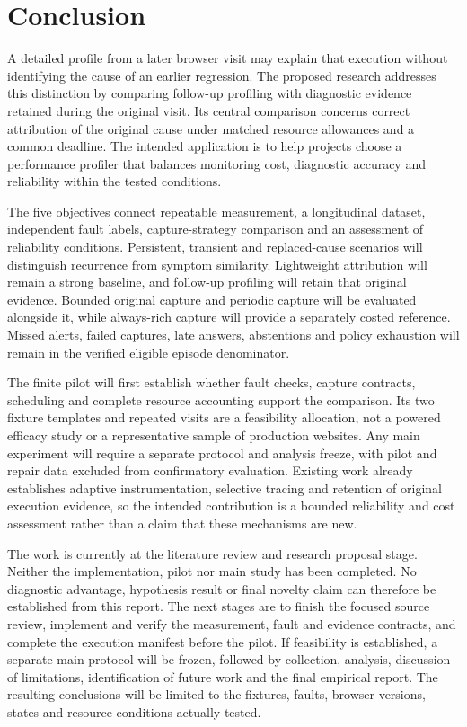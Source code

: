 \chapter{Conclusion}
\label{chap:conclusion}

A detailed profile from a later browser visit may explain that execution without identifying the cause of an earlier regression. The proposed research addresses this distinction by comparing follow-up profiling with diagnostic evidence retained during the original visit. Its central comparison concerns correct attribution of the original cause under matched resource allowances and a common deadline. The intended application is to help projects choose a performance profiler that balances monitoring cost, diagnostic accuracy and reliability within the tested conditions.

The five objectives connect repeatable measurement, a longitudinal dataset, independent fault labels, capture-strategy comparison and an assessment of reliability conditions. Persistent, transient and replaced-cause scenarios will distinguish recurrence from symptom similarity. Lightweight attribution will remain a strong baseline, and follow-up profiling will retain that original evidence. Bounded original capture and periodic capture will be evaluated alongside it, while always-rich capture will provide a separately costed reference. Missed alerts, failed captures, late answers, abstentions and policy exhaustion will remain in the verified eligible episode denominator.

The finite pilot will first establish whether fault checks, capture contracts, scheduling and complete resource accounting support the comparison. Its two fixture templates and repeated visits are a feasibility allocation, not a powered efficacy study or a representative sample of production websites. Any main experiment will require a separate protocol and analysis freeze, with pilot and repair data excluded from confirmatory evaluation. Existing work already establishes adaptive instrumentation, selective tracing and retention of original execution evidence, so the intended contribution is a bounded reliability and cost assessment rather than a claim that these mechanisms are new.

The work is currently at the literature review and research proposal stage. Neither the implementation, pilot nor main study has been completed. No diagnostic advantage, hypothesis result or final novelty claim can therefore be established from this report. The next stages are to finish the focused source review, implement and verify the measurement, fault and evidence contracts, and complete the execution manifest before the pilot. If feasibility is established, a separate main protocol will be frozen, followed by collection, analysis, discussion of limitations, identification of future work and the final empirical report. The resulting conclusions will be limited to the fixtures, faults, browser versions, states and resource conditions actually tested.
